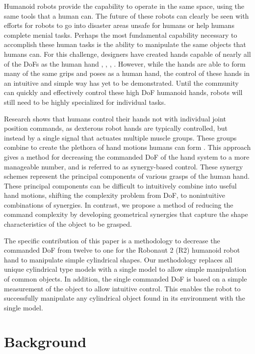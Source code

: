 \documentclass[runningheads,a4paper]{llncs}
\begin{document}
Humanoid robots provide the capability to operate in the same space, using the same tools that a human can. The future of these robots can clearly be seen with efforts for robots to go into disaster areas unsafe for humans \cite{fukushima_robots} or help humans complete menial tasks. Perhaps the most fundamental capability necessary to accomplish these human tasks is the ability to manipulate the same objects that humans can. For this challenge, designers have created hands capable of nearly all of the DoFs as the human hand \cite{r2_hand}, \cite{DRL}, \cite{hrp3}, \cite{softhand}. However, while the hands are able to form many of the same grips and poses as a human hand, the control of these hands in an intuitive and simple way has yet to be demonstrated. Until the community can quickly and effectively control these high DoF humanoid hands, robots will still need to be highly specialized for individual tasks. \par
Research shows that humans control their hands not with individual joint position commands, as dexterous robot hands are typically controlled, but instead by a single signal that actuates multiple muscle groups. These groups combine to create the plethora of hand motions humans can form \cite{Santello} \cite{neuro}. This approach gives a method for decreasing the commanded DoF of the hand system to a more manageable number, and is referred to as synergy-based control. These synergy schemes represent the principal components of various grasps of the human hand. These principal components can be difficult to intuitively combine into useful hand motions, shifting the complexity problem from DoF, to nonintuitive combinations of synergies.  In contrast, we propose a method of reducing the command complexity by developing geometrical synergies that capture the shape characteristics of the object to be grasped. \par
The specific contribution of this paper is a methodology to decrease the commanded DoF from twelve to one for the Robonaut 2 (R2) humanoid robot hand to manipulate simple cylindrical shapes. Our methodology replaces all unique cylindrical type models with a single model to allow simple manipulation of common objects. In addition, the single commanded DoF is based on a simple measurement of the object to allow intuitive control. This enables the robot to successfully manipulate any cylindrical object found in its environment with the single model.

\section{Background}
\end{document}
